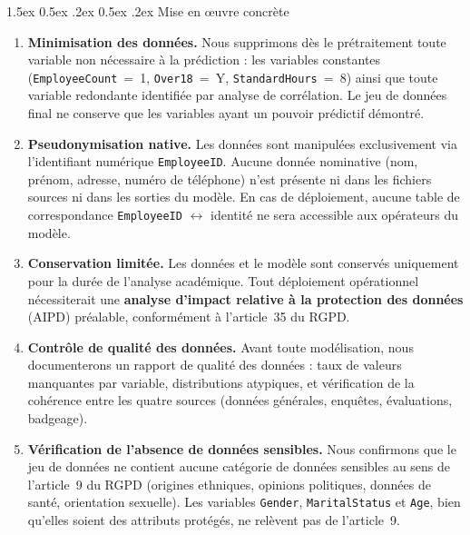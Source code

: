 \documentclass[12pt,a4paper]{article}
\makeatletter
\renewcommand\paragraph{\@startsection{paragraph}{4}{\z@}%
  {1.5ex \@plus 0.5ex \@minus .2ex}%
  {0.5ex \@plus .2ex}%
  {\normalfont\normalsize\bfseries}}
\makeatother
\begin{document}
\paragraph{Mise en \oe uvre concrète}
\begin{enumerate}
    \item \textbf{Minimisation des données.} Nous supprimons dès le prétraitement toute variable non nécessaire à la prédiction : les variables constantes (\texttt{EmployeeCount}~=~1, \texttt{Over18}~=~Y, \texttt{StandardHours}~=~8) ainsi que toute variable redondante identifiée par analyse de corrélation. Le jeu de données final ne conserve que les variables ayant un pouvoir prédictif démontré.
    \item \textbf{Pseudonymisation native.} Les données sont manipulées exclusivement via l'identifiant numérique \texttt{EmployeeID}. Aucune donnée nominative (nom, prénom, adresse, numéro de téléphone) n'est présente ni dans les fichiers sources ni dans les sorties du modèle. En cas de déploiement, aucune table de correspondance \texttt{EmployeeID} $\leftrightarrow$ identité ne sera accessible aux opérateurs du modèle.
    \item \textbf{Conservation limitée.} Les données et le modèle sont conservés uniquement pour la durée de l'analyse académique. Tout déploiement opérationnel nécessiterait une \textbf{analyse d'impact relative à la protection des données} (AIPD) préalable, conformément à l'article~35 du RGPD.
    \item \textbf{Contrôle de qualité des données.} Avant toute modélisation, nous documenterons un rapport de qualité des données : taux de valeurs manquantes par variable, distributions atypiques, et vérification de la cohérence entre les quatre sources (données générales, enquêtes, évaluations, badgeage).
    \item \textbf{Vérification de l'absence de données sensibles.} Nous confirmons que le jeu de données ne contient aucune catégorie de données sensibles au sens de l'article~9 du RGPD (origines ethniques, opinions politiques, données de santé, orientation sexuelle). Les variables \texttt{Gender}, \texttt{MaritalStatus} et \texttt{Age}, bien qu'elles soient des attributs protégés, ne relèvent pas de l'article~9.
\end{enumerate}
\end{document}
